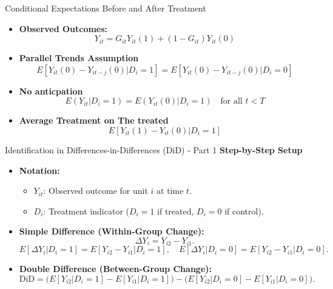 \documentclass[xcolor=svgnames,t]{beamer}
\begin{document}
    \begin{frame}{Conditional Expectations Before and After Treatment}
    \begin{itemize}
        \item \textbf{Observed Outcomes:}
        \begin{equation*}
        Y_{it} = G_{it} Y_{it}(1) + (1 - G_{it}) Y_{it}(0)
        \end{equation*}
        
        \item \textbf{Parallel Trends Assumption}
        \begin{equation*}
            E[Y_{it}(0) - Y_{it-j}(0) | D_i = 1] = E[Y_{it}(0) - Y_{it-j}(0) | D_i = 0]
        \end{equation*}
        \pause
        \item \textbf{No anticpation}\\
         \[
        E(Y_{it}|D_i=1)=E(Y_{it}(0)|D_i=1) \quad \text{for all } t<T
        \] \pause
        \item \textbf{Average Treatment on The treated}
        \begin{equation*}
        E[Y_{it}(1) - Y_{it}(0) | D_i = 1]
        \end{equation*}
    \end{itemize}
    \end{frame}
    
    \begin{frame}{Identification in Differences-in-Differences (DiD) - Part 1}
        \textbf{Step-by-Step Setup}
        \begin{itemize}
            \item \textbf{Notation:} 
            \begin{itemize}
                \item $Y_{it}$: Observed outcome for unit $i$ at time $t$.
                \item $D_i$: Treatment indicator ($D_i=1$ if treated, $D_i=0$ if control).
            \end{itemize}
    
            \item \textbf{Simple Difference (Within-Group Change):}
            \[
            \Delta Y_i = Y_{i2} - Y_{i1}.
            \]
            \[
            E[\Delta Y_i | D_i=1] = E[Y_{i2}-Y_{i1} | D_i=1],
            \quad
            E[\Delta Y_i | D_i=0] = E[Y_{i2}-Y_{i1} | D_i=0].
            \]
    
            \item \textbf{Double Difference (Between-Group Change):}
            \[
            \text{DiD} = \big(E[Y_{i2} | D_i=1]-E[Y_{i1} | D_i=1]\big) - \big(E[Y_{i2} | D_i=0]-E[Y_{i1} | D_i=0]\big).
            \]
        \end{itemize}
    \end{frame}
    
\end{document}
